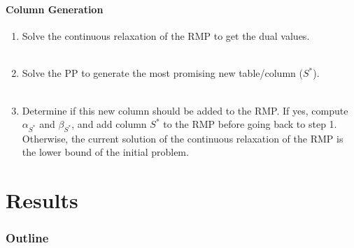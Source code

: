 \documentclass{beamer}
\newcommand{\AutoSectionTitle}{}
\begin{document}


\begin{frame}
  \frametitle{\AutoSectionTitle}
  \framesubtitle{Column Generation}
  
  \begin{enumerate}
  \item Solve the continuous relaxation of the RMP to get the dual values. \\~\\

    \pause
    
  \item Solve the PP to generate the most promising new table/column ($S^{*}$). \\~\\

    \pause
    
  \item Determine if this new column should be added to the RMP. If yes, compute $\alpha_{S^{*}}$ and $\beta_{S^{*}}$, and add column $S^{*}$ to the RMP before going back to step 1. Otherwise, the current solution of the continuous relaxation of the RMP is the lower bound of the initial problem.
  \end{enumerate}
  
\end{frame}




\renewcommand{\AutoSectionTitle}{Results}

\section{\AutoSectionTitle}

\begin{frame}
  \frametitle{Outline}
  \tableofcontents[currentsection]
\end{frame}


\end{document}
